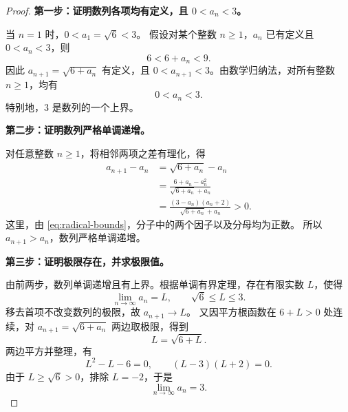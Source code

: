 \documentclass{ctexart}
\begin{document}
\begin{proof}
\textbf{第一步：证明数列各项均有定义，且 $0<a_n<3$。}

当 $n=1$ 时，$0<a_1=\sqrt{6}<3$。
假设对某个整数 $n\ge1$，$a_n$ 已有定义且 $0<a_n<3$，则
\[
  6<6+a_n<9.
\]
因此 $a_{n+1}=\sqrt{6+a_n}$ 有定义，且
$0<a_{n+1}<3$。由数学归纳法，对所有整数 $n\ge1$，均有
\begin{equation}\label{eq:radical-bounds}
  0<a_n<3.
\end{equation}
特别地，$3$ 是数列的一个上界。

\textbf{第二步：证明数列严格单调递增。}

对任意整数 $n\ge1$，将相邻两项之差有理化，得
\begin{align*}
  a_{n+1}-a_n
  &=\sqrt{6+a_n}-a_n\\
  &=\frac{6+a_n-a_n^2}{\sqrt{6+a_n}+a_n}\\
  &=\frac{(3-a_n)(a_n+2)}{\sqrt{6+a_n}+a_n}>0.
\end{align*}
这里，由 \eqref{eq:radical-bounds}，分子中的两个因子以及分母均为正数。
所以 $a_{n+1}>a_n$，数列严格单调递增。

\textbf{第三步：证明极限存在，并求极限值。}

由前两步，数列单调递增且有上界。根据单调有界定理，存在有限实数 $L$，使得
\[
  \lim_{n\to\infty}a_n=L,\qquad \sqrt{6}\le L\le3.
\]
移去首项不改变数列的极限，故 $a_{n+1}\to L$。
又因平方根函数在 $6+L>0$ 处连续，对
$a_{n+1}=\sqrt{6+a_n}$ 两边取极限，得到
\[
  L=\sqrt{6+L}.
\]
两边平方并整理，有
\[
  L^2-L-6=0,\qquad (L-3)(L+2)=0.
\]
由于 $L\ge\sqrt{6}>0$，排除 $L=-2$，于是
\begin{equation}\label{eq:radical-limit}
  \boxed{\displaystyle\lim_{n\to\infty}a_n=3}.
\end{equation}
\end{proof}
\end{document}
